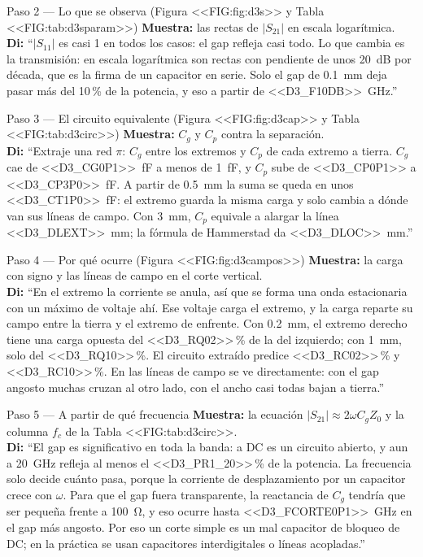 \documentclass[11pt,letterpaper]{article}
\begin{document}
\begin{paso}{Paso 2 --- Lo que se observa (Figura <<FIG:fig:d3s>> y Tabla <<FIG:tab:d3sparam>>)}
\textbf{Muestra:} las rectas de $|S_{21}|$ en escala logarítmica.\\
\textbf{Di:} ``$|S_{11}|$ es casi 1 en todos los casos: el gap refleja casi todo. Lo que cambia es la transmisión: en escala logarítmica son rectas con pendiente de unos 20~dB por década, que es la firma de un capacitor en serie. Solo el gap de \SI{0.1}{mm} deja pasar más del 10\,\% de la potencia, y eso a partir de \SI{<<D3_F10DB>>}{GHz}.''
\end{paso}

\begin{paso}{Paso 3 --- El circuito equivalente (Figura <<FIG:fig:d3cap>> y Tabla <<FIG:tab:d3circ>>)}
\textbf{Muestra:} $C_g$ y $C_p$ contra la separación.\\
\textbf{Di:} ``Extraje una red $\pi$: $C_g$ entre los extremos y $C_p$ de cada extremo a tierra. $C_g$ cae de \SI{<<D3_CG0P1>>}{fF} a menos de \SI{1}{fF}, y $C_p$ sube de \SI{<<D3_CP0P1>>}{} a \SI{<<D3_CP3P0>>}{fF}. A partir de \SI{0.5}{mm} la suma se queda en unos \SI{<<D3_CT1P0>>}{fF}: el extremo guarda la misma carga y solo cambia a dónde van sus líneas de campo. Con \SI{3}{mm}, $C_p$ equivale a alargar la línea \SI{<<D3_DLEXT>>}{mm}; la fórmula de Hammerstad da \SI{<<D3_DLOC>>}{mm}.''
\end{paso}

\begin{paso}{Paso 4 --- Por qué ocurre (Figura <<FIG:fig:d3campos>>)}
\textbf{Muestra:} la carga con signo y las líneas de campo en el corte vertical.\\
\textbf{Di:} ``En el extremo la corriente se anula, así que se forma una onda estacionaria con un máximo de voltaje ahí. Ese voltaje carga el extremo, y la carga reparte su campo entre la tierra y el extremo de enfrente. Con \SI{0.2}{mm}, el extremo derecho tiene una carga opuesta del <<D3_RQ02>>\,\% de la del izquierdo; con \SI{1}{mm}, solo del <<D3_RQ10>>\,\%. El circuito extraído predice <<D3_RC02>>\,\% y <<D3_RC10>>\,\%. En las líneas de campo se ve directamente: con el gap angosto muchas cruzan al otro lado, con el ancho casi todas bajan a tierra.''
\end{paso}

\begin{paso}{Paso 5 --- A partir de qué frecuencia}
\textbf{Muestra:} la ecuación $|S_{21}|\approx 2\omega C_gZ_0$ y la columna $f_c$ de la Tabla <<FIG:tab:d3circ>>.\\
\textbf{Di:} ``El gap es significativo en toda la banda: a DC es un circuito abierto, y aun a \SI{20}{GHz} refleja al menos el <<D3_PR1_20>>\,\% de la potencia. La frecuencia solo decide cuánto pasa, porque la corriente de desplazamiento por un capacitor crece con $\omega$. Para que el gap fuera transparente, la reactancia de $C_g$ tendría que ser pequeña frente a \SI{100}{\ohm}, y eso ocurre hasta \SI{<<D3_FCORTE0P1>>}{GHz} en el gap más angosto. Por eso un corte simple es un mal capacitor de bloqueo de DC; en la práctica se usan capacitores interdigitales o líneas acopladas.''
\end{paso}
\end{document}
